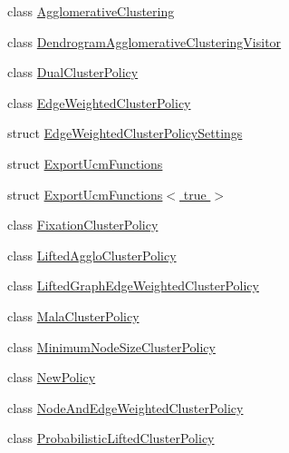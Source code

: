 \begin{DoxyCompactItemize}
\item 
class \hyperlink{classnifty_1_1graph_1_1agglo_1_1AgglomerativeClustering}{Agglomerative\+Clustering}
\item 
class \hyperlink{classnifty_1_1graph_1_1agglo_1_1DendrogramAgglomerativeClusteringVisitor}{Dendrogram\+Agglomerative\+Clustering\+Visitor}
\item 
class \hyperlink{classnifty_1_1graph_1_1agglo_1_1DualClusterPolicy}{Dual\+Cluster\+Policy}
\item 
class \hyperlink{classnifty_1_1graph_1_1agglo_1_1EdgeWeightedClusterPolicy}{Edge\+Weighted\+Cluster\+Policy}
\item 
struct \hyperlink{structnifty_1_1graph_1_1agglo_1_1EdgeWeightedClusterPolicySettings}{Edge\+Weighted\+Cluster\+Policy\+Settings}
\item 
struct \hyperlink{structnifty_1_1graph_1_1agglo_1_1ExportUcmFunctions}{Export\+Ucm\+Functions}
\item 
struct \hyperlink{structnifty_1_1graph_1_1agglo_1_1ExportUcmFunctions_3_01true_01_4}{Export\+Ucm\+Functions$<$ true $>$}
\item 
class \hyperlink{classnifty_1_1graph_1_1agglo_1_1FixationClusterPolicy}{Fixation\+Cluster\+Policy}
\item 
class \hyperlink{classnifty_1_1graph_1_1agglo_1_1LiftedAggloClusterPolicy}{Lifted\+Agglo\+Cluster\+Policy}
\item 
class \hyperlink{classnifty_1_1graph_1_1agglo_1_1LiftedGraphEdgeWeightedClusterPolicy}{Lifted\+Graph\+Edge\+Weighted\+Cluster\+Policy}
\item 
class \hyperlink{classnifty_1_1graph_1_1agglo_1_1MalaClusterPolicy}{Mala\+Cluster\+Policy}
\item 
class \hyperlink{classnifty_1_1graph_1_1agglo_1_1MinimumNodeSizeClusterPolicy}{Minimum\+Node\+Size\+Cluster\+Policy}
\item 
class \hyperlink{classnifty_1_1graph_1_1agglo_1_1NewPolicy}{New\+Policy}
\item 
class \hyperlink{classnifty_1_1graph_1_1agglo_1_1NodeAndEdgeWeightedClusterPolicy}{Node\+And\+Edge\+Weighted\+Cluster\+Policy}
\item 
class \hyperlink{classnifty_1_1graph_1_1agglo_1_1ProbabilisticLiftedClusterPolicy}{Probabilistic\+Lifted\+Cluster\+Policy}
\end{DoxyCompactItemize}

